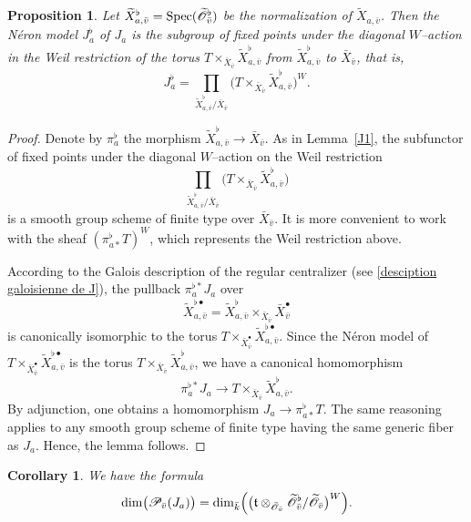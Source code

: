 \documentclass[12pt,english]{smfart}
\numberwithin{equation}{subsection}
\newtheorem{proposition}[equation]{Proposition}
\newtheorem{corollary}[equation]{Corollary}
\theoremstyle{remark}
\newcommand\calP{{\mathscr P}}
\newcommand\calO{{\mathscr O}}
\newcommand\frakt{{\mathfrak t}}
\newcommand\Spec{{\rm Spec}}
\begin{document}
\begin{proposition}\label{J a flat}
Let $\widetilde X_{a,\bar v}^\flat=\Spec(\widetilde \calO_{\bar v}^\flat)$ be the normalization of $\widetilde X_{a,\bar v}$. Then the N\'eron model $J_a^\flat$ of $J_a$ is the subgroup of fixed points under the diagonal $W$--action in the Weil restriction of the torus $T\times_{\bar X_{\bar v}} \widetilde X_{a,\bar v}^\flat$ from $\widetilde X_{a,\bar v}^\flat$ to $\bar X_{\bar v}$, that is,
$$
J_a^\flat=\prod_{\widetilde X_{a,\bar v}^\flat/\bar X_{\bar v}} \bigl(T\times_{\bar X_{\bar v}} \widetilde X_{a,\bar v}^\flat\bigr)^W.
$$
\end{proposition}

\begin{proof}
Denote by $\pi_a^\flat$ the morphism $\widetilde X_{a,\bar v}^\flat \to \bar X_{\bar v}$. As in Lemma~\ref{J1}, the subfunctor of fixed points under the diagonal $W$--action on the Weil restriction 
$$\prod_{\widetilde X_{a,\bar v}^\flat/\bar X_{\bar v}} \bigl(T\times_{\bar X_{\bar v}} \widetilde X_{a,\bar v}^\flat\bigr)$$ 
is a smooth group scheme of finite type over $\bar X_{\bar v}$. It is more convenient to work with the sheaf $(\pi_{a*}^\flat T)^W$, which represents the Weil restriction above.

According to the Galois description of the regular centralizer (see \ref{desciption galoisienne de J}), the pullback $\pi_a^{\flat*} J_a$ over 
$$\widetilde X_{a,\bar v}^{\flat\bullet}=\widetilde X_{a,\bar v}^\flat\times_{\bar X_{\bar v}} \bar X_{\bar v}^\bullet$$
is canonically isomorphic to the torus $T\times_{\bar X_{\bar v}^\bullet} \widetilde X_{a,\bar v}^{\flat\bullet}$. Since the N\'eron model of $T\times_{\bar X_{\bar v}^\bullet} \widetilde X_{a,\bar v}^{\flat\bullet}$ is the torus $T\times_{\bar X_{\bar v}} \widetilde X_{a,\bar v}^\flat$, we have a canonical homomorphism
$$
\pi_a^{\flat*} J_a \longrightarrow T\times_{\bar X_{\bar v}} \widetilde X_{a,\bar v}^\flat.
$$
By adjunction, one obtains a homomorphism $J_a \longrightarrow \pi_{a*}^\flat T$. The same reasoning applies to any smooth group scheme of finite type having the same generic fiber as $J_a$. Hence, the lemma follows.
\end{proof}

\begin{corollary}\label{delta local}
We have the formula
$$
\dim\bigl(\calP_{\bar v}(J_a)\bigr)=\dim_{\bar{k}}\Bigl(\bigl(\frakt\otimes_{\bar{\calO}_{\bar v}} \widetilde \calO_{\bar v}^\flat/\widetilde\calO_{\bar v}\bigr)^W\Bigr).
$$
\end{corollary}
\end{document}
